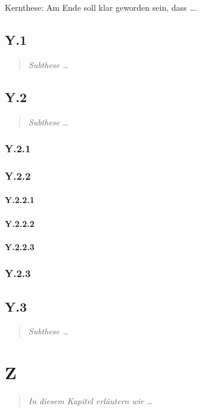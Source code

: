 \documentclass[DIV=calc,BCOR=5mm,11pt,headings=small,oneside,abstract=true,toc=bib]{scrbook}
\begin{document}
Kernthese: Am Ende soll klar geworden sein, dass \ldots.

\section{Y.1}
\begin{quote}\itshape
Subthese \ldots
\end{quote} 

\section{Y.2}
\begin{quote}\itshape
Subthese \ldots
\end{quote} 

\subsection{Y.2.1}

\subsection{Y.2.2}

\subsubsection{Y.2.2.1}
\subsubsection{Y.2.2.2}
\subsubsection{Y.2.2.3}

\subsection{Y.2.3}

\section{Y.3}
\begin{quote}\itshape
Subthese \ldots
\end{quote} 

\chapter{Z}
\begin{quote}\itshape
In diesem Kapitel erläutern wir \ldots
\end{quote} 
\end{document}
